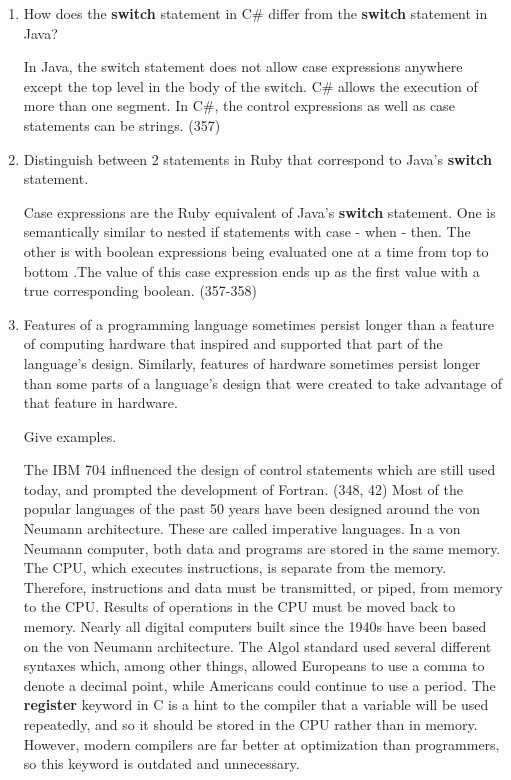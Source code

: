 \begin{enumerate}
  \item How does the \textbf{switch} statement in C\#
    differ from the \textbf{switch} statement in Java?

 \begin{answer}
   In Java, the switch statement does not allow case expressions
   anywhere except the top level in the body of the switch.  C\#
   allows the execution of more than one segment. In C\#, the control
   expressions as well as case statements can be strings. (357)
 \end{answer}
 
  \item Distinguish between 2 statements in Ruby
    that correspond to Java's \textbf{switch} statement.

 \begin{answer}
    Case expressions are the Ruby equivalent of Java's \textbf{switch}
    statement. One is semantically similar to nested if statements
    with case - when - then. The other is with boolean expressions
    being evaluated one at a time from top to bottom .The value of
    this case expression ends up as the first value with a true
    corresponding boolean. (357-358)
     \end{answer}

  \item Features of a programming language sometimes persist
    longer than a feature of computing hardware that inspired
    and supported that part of the language's design.
    Similarly, features of hardware sometimes persist longer
    than some parts of a language's design that were created
    to take advantage of that feature in hardware.

    Give examples.

 \begin{answer}
    The IBM 704 influenced the design of control statements which are
    still used today, and prompted the development of Fortran. (348,
    42) Most of the popular languages of the past 50 years have been
    designed around the von Neumann architecture. These are called
    imperative languages. In a von Neumann computer, both data and
    programs are stored in the same memory. The CPU, which executes
    instructions, is separate from the memory. Therefore, instructions
    and data must be transmitted, or piped, from memory to the
    CPU. Results of operations in the CPU must be moved back to
    memory. Nearly all digital computers built since the 1940s have
    been based on the von Neumann architecture.  The Algol standard
    used several different syntaxes which, among other things, allowed
    Europeans to use a comma to denote a decimal point, while
    Americans could continue to use a period.  The \textbf{register}
    keyword in C is a hint to the compiler that a variable will be
    used repeatedly, and so it should be stored in the CPU rather than
    in memory. However, modern compilers are far better at
    optimization than programmers, so this keyword is outdated and
    unnecessary.
     \end{answer}


\end{enumerate}
